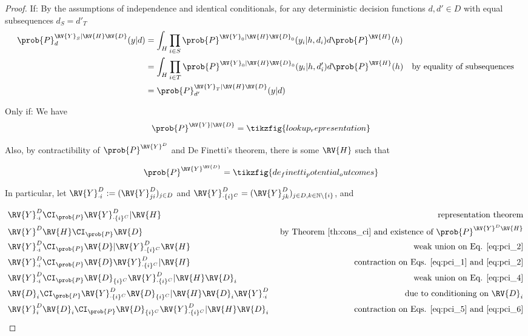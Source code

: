 \begin{proof}
If:
By the assumptions of independence and identical conditionals, for any deterministic decision functions $d,d'\in D$ with equal subsequences $d_S=d'_T$
\begin{align}
    \prob{P}_d^{\RV{Y}_S|\RV{H}\RV{D}}(y|d) &= \int_H\prod_{i\in S}\prob{P}^{\RV{Y}_0|\RV{H}\RV{D}_0}(y_i|h,d_i)d\prob{P}^{\RV{H}}(h)\\
                                          &= \int_{H}\prod_{i\in T}\prob{P}^{\RV{Y}_0|\RV{H}\RV{D}_0}(y_i|h,d'_i)d\prob{P}^{\RV{H}}(h) & \text{by equality of subsequences}\\
                                          &= \prob{P}_{d'}^{\RV{Y}_T|\RV{H}\RV{D}}(y|d)
\end{align}

Only if:
We have
\begin{align}
    \prob{P}^{\RV{Y}|\RV{D}} &= \tikzfig{lookup_representation}
\end{align}

Also, by contractibility of $\prob{P}^{\RV{Y}^D}$ and De Finetti's theorem, there is some $\RV{H}$ such that

\begin{align}
    \prob{P}^{\RV{Y}^\RV{D}} &= \tikzfig{de_finetti_potential_outcomes}
\end{align}

In particular, let $\RV{Y}^D_{\cdot i}:=(\RV{Y}^D_{ji})_{j\in D}$ and $\RV{Y}^D_{\cdot \{i\}^C} = (\RV{Y}^D_{jk})_{j\in D, k\in \mathbb{N}\setminus \{i\}}$, and

\begin{align}
    &\RV{Y}^D_{\cdot i} \CI_{\prob{P}} \RV{Y}^D_{\cdot \{i\}^C} |\RV{H} & \text{ representation theorem}\label{eq:pci_1}\\
    &\RV{Y}^D\RV{H} \CI_{\prob{P}} \RV{D} &\text{ by Theorem \ref{th:cons_ci} and existence of }\prob{P}^{\RV{Y}^D\RV{H}}\label{eq:pci_2}\\
    &\RV{Y}^D_{\cdot i}\CI_{\prob{P}} \RV{D} |\RV{Y}^D_{\cdot \{i\}^C}\RV{H}&\text{ weak union on Eq. }\ref{eq:pci_2}\\
    &\RV{Y}^D_{\cdot i}\CI_{\prob{P}} \RV{D}\RV{Y}^D_{\cdot \{i\}^C} |\RV{H}&\text{ contraction on Eqs. \ref{eq:pci_1} and \ref{eq:pci_2}}\label{eq:pci_4}\\
    &\RV{Y}^D_{\cdot i}\CI_{\prob{P}} \RV{D}_{\{i\}^C}\RV{Y}^D_{\cdot \{i\}^C} |\RV{H}\RV{D}_i&\text{ weak union on Eq. \ref{eq:pci_4}}\label{eq:pci_5}\\
    &\RV{D}_{i} \CI_{\prob{P}}\RV{Y}^D_{\cdot \{i\}^C} \RV{D}_{\{i\}^C} |\RV{H}\RV{D}_i \RV{Y}^D_{\cdot i}&\text{ due to conditioning on }\RV{D}_i\label{eq:pci_6}\\
    &\RV{Y}^D_{i}\RV{D}_i \CI_{\prob{P}} \RV{D}_{\{i\}^C}\RV{Y}^D_{\cdot \{i\}^C} |\RV{H}\RV{D}_i&\text{ contraction on Eqs. \ref{eq:pci_5} and \ref{eq:pci_6}}\label{eq:pci_7}\\
\end{align}


\end{proof}
